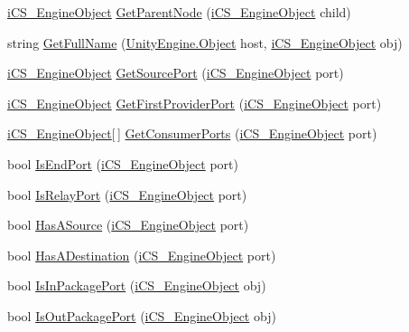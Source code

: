 \begin{DoxyCompactItemize}
\item 
\hyperlink{classi_c_s___engine_object}{i\+C\+S\+\_\+\+Engine\+Object} \hyperlink{classi_c_s___visual_script_data_afc595bc74f3cf4054b46c38201e6d971}{Get\+Parent\+Node} (\hyperlink{classi_c_s___engine_object}{i\+C\+S\+\_\+\+Engine\+Object} child)
\item 
string \hyperlink{classi_c_s___visual_script_data_ab76787ad26cdb467e4d94d2eb3f228c1}{Get\+Full\+Name} (\hyperlink{i_c_s___logic_8cs_a5b2c8b05b9a357906d7f9e5b2c1e154d}{Unity\+Engine.\+Object} host, \hyperlink{classi_c_s___engine_object}{i\+C\+S\+\_\+\+Engine\+Object} obj)
\item 
\hyperlink{classi_c_s___engine_object}{i\+C\+S\+\_\+\+Engine\+Object} \hyperlink{classi_c_s___visual_script_data_aca85092956029583ee4dc13e29aac276}{Get\+Source\+Port} (\hyperlink{classi_c_s___engine_object}{i\+C\+S\+\_\+\+Engine\+Object} port)
\item 
\hyperlink{classi_c_s___engine_object}{i\+C\+S\+\_\+\+Engine\+Object} \hyperlink{classi_c_s___visual_script_data_a37d3ca0e77f8732eeb226150cc6881ce}{Get\+First\+Provider\+Port} (\hyperlink{classi_c_s___engine_object}{i\+C\+S\+\_\+\+Engine\+Object} port)
\item 
\hyperlink{classi_c_s___engine_object}{i\+C\+S\+\_\+\+Engine\+Object}\mbox{[}$\,$\mbox{]} \hyperlink{classi_c_s___visual_script_data_afd6cb67569d9c9d6d9484298a068a8a7}{Get\+Consumer\+Ports} (\hyperlink{classi_c_s___engine_object}{i\+C\+S\+\_\+\+Engine\+Object} port)
\item 
bool \hyperlink{classi_c_s___visual_script_data_a9b9a24784405ccb0c3247d14a41d640b}{Is\+End\+Port} (\hyperlink{classi_c_s___engine_object}{i\+C\+S\+\_\+\+Engine\+Object} port)
\item 
bool \hyperlink{classi_c_s___visual_script_data_a152c2228ffa5e0d2cfc7de4690b6f409}{Is\+Relay\+Port} (\hyperlink{classi_c_s___engine_object}{i\+C\+S\+\_\+\+Engine\+Object} port)
\item 
bool \hyperlink{classi_c_s___visual_script_data_a52dba416b5ca05a6cfc8964aee8b5479}{Has\+A\+Source} (\hyperlink{classi_c_s___engine_object}{i\+C\+S\+\_\+\+Engine\+Object} port)
\item 
bool \hyperlink{classi_c_s___visual_script_data_a4588a27aeb73fb8a937cb0b538745a93}{Has\+A\+Destination} (\hyperlink{classi_c_s___engine_object}{i\+C\+S\+\_\+\+Engine\+Object} port)
\item 
bool \hyperlink{classi_c_s___visual_script_data_a01da1f7ceee3269797cb80b15f473b0e}{Is\+In\+Package\+Port} (\hyperlink{classi_c_s___engine_object}{i\+C\+S\+\_\+\+Engine\+Object} obj)
\item 
bool \hyperlink{classi_c_s___visual_script_data_a05c6b7daa9e3546c300de81d600423ab}{Is\+Out\+Package\+Port} (\hyperlink{classi_c_s___engine_object}{i\+C\+S\+\_\+\+Engine\+Object} obj)
\end{DoxyCompactItemize}
